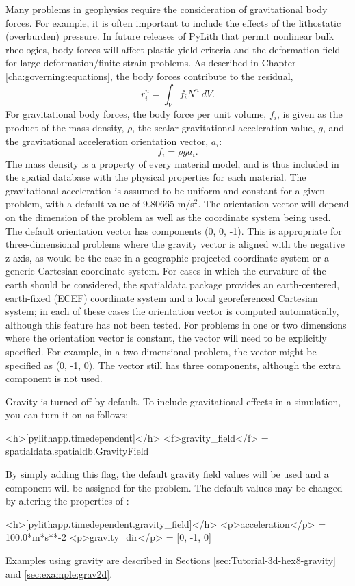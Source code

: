 Many problems in geophysics require the consideration of gravitational
body forces. For example, it is often important to include the effects
of the lithostatic (overburden) pressure. In future releases of PyLith
that permit nonlinear bulk rheologies, body forces will affect plastic
yield criteria and the deformation field for large deformation/finite
strain problems. As described in Chapter \vref{cha:governing:equations},
the body forces contribute to the residual,
\begin{equation}
r_{i}^{n}=\int_{V}f_{i}N^{n}\: dV.
\end{equation}
For gravitational body forces, the body force per unit volume, $f_{i}$,
is given as the product of the mass density, $\rho$, the scalar gravitational
acceleration value, $g$, and the gravitational acceleration orientation
vector, $a_{i}$:
\begin{equation}
f_{i}=\rho ga_{i}.
\end{equation}
The mass density is a property of every material model, and is thus
included in the spatial database with the physical properties for
each material. The gravitational acceleration is assumed to be uniform
and constant for a given problem, with a default value of 9.80665
m/s$^{\text{2}}$. The orientation vector will depend on the dimension
of the problem as well as the coordinate system being used. The default
orientation vector has components (0, 0, -1). This is appropriate
for three-dimensional problems where the gravity vector is aligned
with the negative z-axis, as would be the case in a geographic-projected
coordinate system or a generic Cartesian coordinate system. For cases
in which the curvature of the earth should be considered, the spatialdata
package provides an earth-centered, earth-fixed (ECEF) coordinate
system and a local georeferenced Cartesian system; in each of these
cases the orientation vector is computed automatically, although this
feature has not been tested. For problems in one or two dimensions
where the orientation vector is constant, the vector will need to
be explicitly specified. For example, in a two-dimensional problem,
the vector might be specified as (0, -1, 0). The vector still has
three components, although the extra component is not used.

Gravity is turned off by default. To include gravitational effects
in a simulation, you can turn it on as follows:
\begin{cfg}
<h>[pylithapp.timedependent]</h>
<f>gravity_field</f> = spatialdata.spatialdb.GravityField
\end{cfg}
By simply adding this flag, the default gravity field values will
be used and a  component will be assigned for
the problem. The default values may be changed by altering the properties
of :
\begin{cfg}
<h>[pylithapp.timedependent.gravity_field]</h>
<p>acceleration</p> = 100.0*m*s**-2
<p>gravity_dir</p> = [0, -1, 0]
\end{cfg}
Examples using gravity are described in Sections \vref{sec:Tutorial-3d-hex8-gravity}
and \vref{sec:example:grav2d}.

